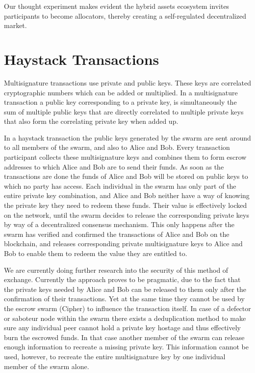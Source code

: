 \documentclass[a4paper]{article}
\begin{document}
Our thought experiment makes evident the hybrid assets ecosystem invites participants to become allocators, thereby creating a self-regulated decentralized market.


\section{Haystack Transactions}

Multisignature transactions use private and public keys. These keys are correlated cryptographic numbers which can be added or multiplied. In a multisignature transaction a public key corresponding to a private key, is simultaneously the sum of multiple public keys that are directly correlated to multiple private keys that also form the correlating private key when added up.

In a haystack transaction the public keys generated by the swarm are sent around to all members of the swarm, and also to Alice and Bob. Every transaction participant collects these multisignature keys and combines them to form escrow addresses to which Alice and Bob are to send their funds. As soon as the transactions are done the funds of Alice and Bob will be stored on public keys to which no party has access. Each individual in the swarm has only part of the entire private key combination, and Alice and Bob neither have a way of knowing the private key they need to redeem these funds. Their value is effectively locked on the network, until the swarm decides to release the corresponding private keys by way of a decentralized consensus mechanism. This only happens after the swarm has verified and confirmed the transactions of Alice and Bob on the blockchain, and releases corresponding private multisignature keys to Alice and Bob to enable them to redeem the value they are entitled to.

We are currently doing further research into the security of this method of exchange. Currently the approach proves to be pragmatic, due to the fact that the private keys needed by Alice and Bob can be released to them only after the confirmation of their transactions. Yet at the same time they cannot be used by the escrow swarm (Cipher) to influence the transaction itself. In case of a defector or saboteur node within the swarm there exists a deduplication method to make sure any individual peer cannot hold a private key hostage and thus effectively burn the escrowed funds. In that case another member of the swarm can release enough information to recreate a missing private key. This information cannot be used, however, to recreate the entire multisignature key by one individual member of the swarm alone.
\end{document}
